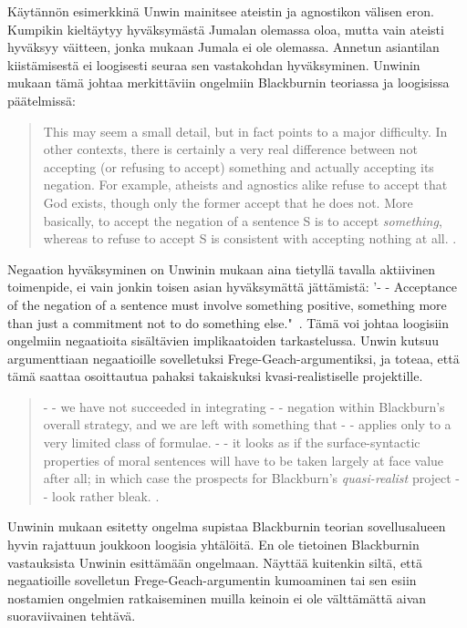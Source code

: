 \documentclass[a4paper,12pt,times,titlepage,finnish]{article}
\begin{document}
Käytännön esimerkkinä Unwin mainitsee ateistin ja agnostikon välisen eron. Kumpikin kieltäytyy hyväksymästä Jumalan olemassa oloa, mutta vain ateisti hyväksyy väitteen, jonka mukaan Jumala ei ole olemassa. Annetun asiantilan kiistämisestä ei loogisesti seuraa sen vastakohdan hyväksyminen. Unwinin mukaan tämä johtaa merkittäviin ongelmiin Blackburnin teoriassa ja loogisissa päätelmissä:

\begin{quote}
	This may seem a small detail, but in fact points to a major difficulty. In other contexts, there is certainly a very real difference between not accepting (or refusing to accept) something and actually accepting its negation. For example, atheists and agnostics alike refuse to accept that God exists, though only the former accept that he does not. More basically, to accept the negation of a sentence S is to accept {\it something}, whereas to refuse to accept S is consistent with accepting nothing at all. \citep[341]{Unwin99}.
\end{quote}

Negaation hyväksyminen on Unwinin mukaan aina tietyllä tavalla aktiivinen toimenpide, ei vain jonkin toisen asian hyväksymättä jättämistä: 
'- - Acceptance of the negation of a sentence must involve something positive, something more than just a commitment not to do something else."\ \citep[342]{Unwin99}. Tämä voi johtaa loogisiin ongelmiin negaatioita sisältävien implikaatoiden tarkastelussa. Unwin kutsuu argumenttiaan negaatioille sovelletuksi Frege-Geach-argumentiksi, ja toteaa, että tämä saattaa osoittautua pahaksi takaiskuksi kvasi-\-realistiselle projektille.

\begin{quote}
	- - we have not succeeded in integrating - - negation within Blackburn's overall strategy, and we are left with something that - - applies only to a very limited class of formulae. - - it looks as if the surface-syntactic properties of moral sentences will have to be taken largely at face value after all; in which case the prospects for Blackburn's {\it quasi-realist} project - - look rather bleak. \citep[352]{Unwin99}.
\end{quote}

Unwinin mukaan esitetty ongelma supistaa Blackburnin teorian sovellusalueen hyvin rajattuun joukkoon loogisia yhtälöitä. En ole tietoinen Blackburnin vastauksista Unwinin esittämään ongelmaan. Näyt\-tää kuitenkin siltä, että negaatioille sovelletun Frege-Geach-argumentin kumoaminen tai sen esiin nostamien ongelmien ratkaiseminen muilla keinoin ei ole vält\-tä\-mät\-tä aivan suoraviivainen tehtävä.
\end{document}
